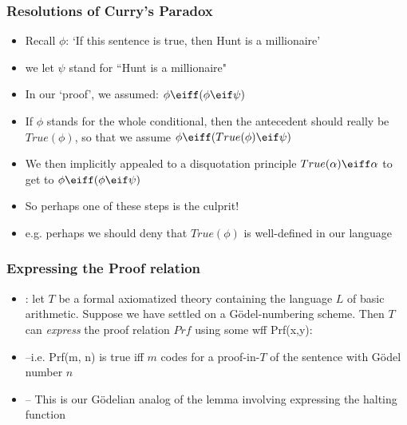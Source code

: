 \begin{frame}
\frametitle{Resolutions of Curry's Paradox}

\begin{itemize}[<+->]

\item Recall $\phi$: `If this sentence is true, then Hunt is a millionaire'

\item[] we let $\psi$ stand for ``Hunt is a millionaire"

\item In our `proof', we assumed: $\phi \eiff (\phi \eif \psi)$

\item If $\phi$ stands for the whole conditional, then the antecedent should really be $True(\phi)$, so that we assume $\phi \eiff (True(\phi) \eif \psi)$

\item We then implicitly appealed to a disquotation principle $True(\alpha) \eiff \alpha$ to get to $\phi \eiff (\phi \eif \psi)$

\item So perhaps one of these steps is the culprit! 

\item e.g. perhaps we should deny that $True(\phi)$ is well-defined in our language 

\end{itemize}
\end{frame}

\begin{frame}
\frametitle{Expressing the Proof relation}

\begin{itemize}[<+->]

\item {}: let $T$ be a formal axiomatized theory containing the language $L$ of basic arithmetic. Suppose we have settled on a G\"odel-numbering scheme. Then $T$ can \textit{express} the proof relation $Prf$ using some wff \textrm{Prf(x,y)}: 

\item[] --i.e. \textrm{Prf(m, n)} is true iff $m$ codes for a proof-in-$T$ of the sentence with G\"odel number $n$

\item[] -- This is our G\"odelian analog of the lemma involving expressing the halting function

\end{itemize}
\end{frame}

